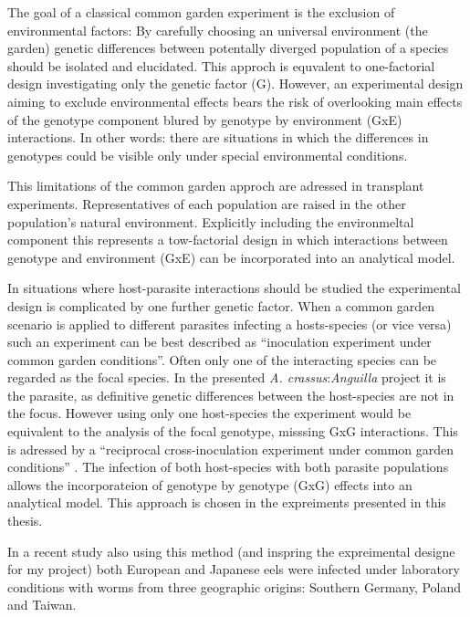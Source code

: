 The goal of a classical common garden experiment is the exclusion of
environmental factors: By carefully choosing an universal environment
(the garden) genetic differences between potentally diverged
population of a species should be isolated and elucidated. This
approch is equvalent to one-factorial design investigating only the
genetic factor (G). However, an experimental design aiming to exclude
environmental effects bears the risk of overlooking main effects of
the genotype component blured by genotype by environment (GxE)
interactions. In other words: there are situations in which the
differences in genotypes could be visible only under special
environmental conditions.

This limitations of the common garden approch are adressed in
transplant experiments. Representatives of each population are raised
in the other population's natural environment. Explicitly including
the environmeltal component this represents a tow-factorial design in
which interactions between genotype and environment (GxE) can be
incorporated into an analytical model.

In situations where host-parasite interactions should be studied the
experimental design is complicated by one further genetic factor.
When a common garden scenario is applied to different parasites
infecting a hosts-species (or vice versa) such an experiment can be
best described as ``inoculation experiment under common garden
conditions''. Often only one of the interacting species can be
regarded as the focal species. In the presented
\textit{A. crassus}:\textit{Anguilla} project it is the parasite, as
definitive genetic differences between the host-species are not in the
focus. However using only one host-species the experiment would be
equivalent to the analysis of the focal genotype, misssing GxG
interactions. This is adressed by a ``reciprocal cross-inoculation
experiment under common garden conditions'' \cite{kaltz_shykoff_rev}.
The infection of both host-species with both parasite populations
allows the incorporateion of genotype by genotype (GxG) effects into
an analytical model. This approach is chosen in the expreiments
presented in this thesis.

In a recent study also using this method (and inspring the
expreimental designe for my project) both European and Japanese eels
were infected under laboratory conditions with worms from three
geographic origins: Southern Germany, Poland and Taiwan.


